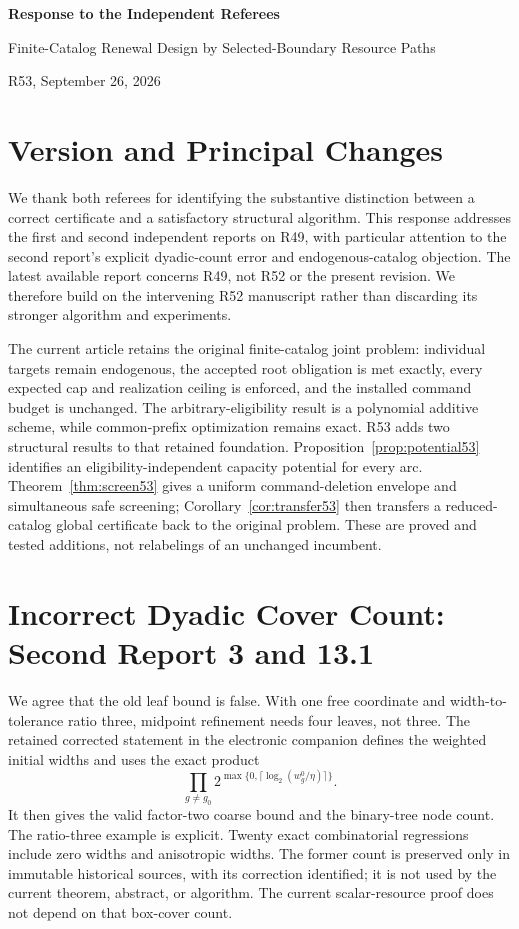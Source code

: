 \begin{center}{\Large\bfseries Response to the Independent Referees}\par\vspace{6pt}
Finite-Catalog Renewal Design by Selected-Boundary Resource Paths\par
R53, September 26, 2026\end{center}

\section*{Version and Principal Changes}
We thank both referees for identifying the substantive distinction between a correct certificate and a satisfactory structural algorithm. This response addresses the first and second independent reports on R49, with particular attention to the second report's explicit dyadic-count error and endogenous-catalog objection. The latest available report concerns R49, not R52 or the present revision. We therefore build on the intervening R52 manuscript rather than discarding its stronger algorithm and experiments.

The current article retains the original finite-catalog joint problem: individual targets remain endogenous, the accepted root obligation is met exactly, every expected cap and realization ceiling is enforced, and the installed command budget is unchanged. The arbitrary-eligibility result is a polynomial additive scheme, while common-prefix optimization remains exact. R53 adds two structural results to that retained foundation. Proposition~\ref{prop:potential53} identifies an eligibility-independent capacity potential for every arc. Theorem~\ref{thm:screen53} gives a uniform command-deletion envelope and simultaneous safe screening; Corollary~\ref{cor:transfer53} then transfers a reduced-catalog global certificate back to the original problem. These are proved and tested additions, not relabelings of an unchanged incumbent.

\section{Incorrect Dyadic Cover Count: Second Report 3 and 13.1}
We agree that the old leaf bound is false. With one free coordinate and width-to-tolerance ratio three, midpoint refinement needs four leaves, not three. The retained corrected statement in the electronic companion defines the weighted initial widths and uses the exact product
\[
 \prod_{g\ne g_0}2^{\max\{0,\lceil\log_2(w_g^0/\eta)\rceil\}}.
\]
It then gives the valid factor-two coarse bound and the binary-tree node count. The ratio-three example is explicit. Twenty exact combinatorial regressions include zero widths and anisotropic widths. The former count is preserved only in immutable historical sources, with its correction identified; it is not used by the current theorem, abstract, or algorithm. The current scalar-resource proof does not depend on that box-cover count.

